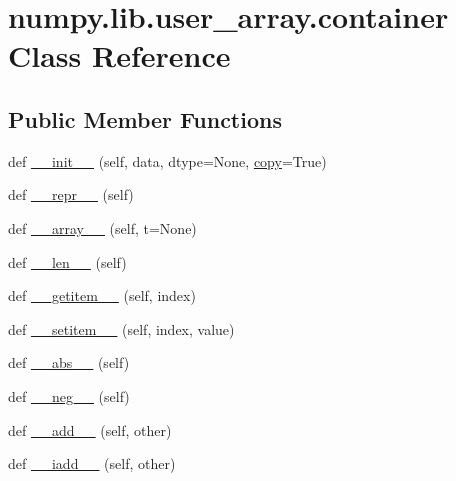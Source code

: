\hypertarget{classnumpy_1_1lib_1_1user__array_1_1container}{}\section{numpy.\+lib.\+user\+\_\+array.\+container Class Reference}
\label{classnumpy_1_1lib_1_1user__array_1_1container}
\subsection*{Public Member Functions}
\begin{DoxyCompactItemize}
\item 
def \hyperlink{classnumpy_1_1lib_1_1user__array_1_1container_ad7a51e42b5c5780f9e30f0c56745ec63}{\+\_\+\+\_\+init\+\_\+\+\_\+} (self, data, dtype=None, \hyperlink{classnumpy_1_1lib_1_1user__array_1_1container_a27c75007f2cb7828ce092a7514e969fb}{copy}=True)
\item 
def \hyperlink{classnumpy_1_1lib_1_1user__array_1_1container_a592db401cb9ae224619c86b18b4cf55b}{\+\_\+\+\_\+repr\+\_\+\+\_\+} (self)
\item 
def \hyperlink{classnumpy_1_1lib_1_1user__array_1_1container_a59c5f36505df57fe31360b0bb7490a37}{\+\_\+\+\_\+array\+\_\+\+\_\+} (self, t=None)
\item 
def \hyperlink{classnumpy_1_1lib_1_1user__array_1_1container_a169f5806402947d65b4d9974f62f5b31}{\+\_\+\+\_\+len\+\_\+\+\_\+} (self)
\item 
def \hyperlink{classnumpy_1_1lib_1_1user__array_1_1container_a1d7afe5576768462f4f10a8f86a899e2}{\+\_\+\+\_\+getitem\+\_\+\+\_\+} (self, index)
\item 
def \hyperlink{classnumpy_1_1lib_1_1user__array_1_1container_a3b466065f38c36907967530f718c5270}{\+\_\+\+\_\+setitem\+\_\+\+\_\+} (self, index, value)
\item 
def \hyperlink{classnumpy_1_1lib_1_1user__array_1_1container_a53aea1c6cccdaba3889662d533008671}{\+\_\+\+\_\+abs\+\_\+\+\_\+} (self)
\item 
def \hyperlink{classnumpy_1_1lib_1_1user__array_1_1container_aecad0c71bc442975147f4bd54a317e13}{\+\_\+\+\_\+neg\+\_\+\+\_\+} (self)
\item 
def \hyperlink{classnumpy_1_1lib_1_1user__array_1_1container_ab1d4bb63364c930c7928841aa4bffaf4}{\+\_\+\+\_\+add\+\_\+\+\_\+} (self, other)
\item 
def \hyperlink{classnumpy_1_1lib_1_1user__array_1_1container_a02b6cf1005d5c4a79224d41e510ca632}{\+\_\+\+\_\+iadd\+\_\+\+\_\+} (self, other)

\end{DoxyCompactItemize}
